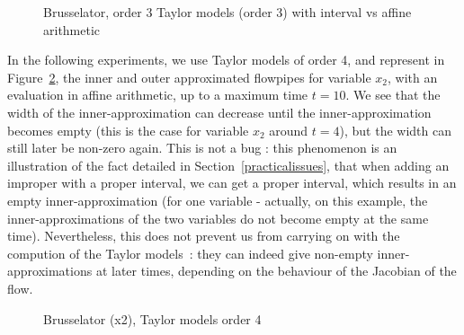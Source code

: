 \begin{figure}[htbp]
\begin{center}
\end{center}
\caption{Brusselator, order 3 Taylor models (order 3) with interval vs affine arithmetic \label{fig:brusselator_order3_t1}}
\end{figure}

In the following experiments, we use Taylor models of order 4, and represent  in Figure~\ref{fig:brusselator_order4_x2_t10}, the inner and outer approximated flowpipes for variable $x_2$, with an evaluation in affine arithmetic, up to a maximum time $t=10$. We see that the width of the inner-approximation can decrease until the inner-approximation becomes empty (this is the case for variable $x_2$ around $t=4$), but the width can still later be non-zero again. 
This is not a bug : this phenomenon is an illustration of the fact detailed in Section~\ref{practicalissues}, that when adding an improper with a proper interval, we can get a proper interval, which results in an empty inner-approximation (for one variable - actually, on this example, the inner-approximations of the two variables do not become empty at the same time). 
Nevertheless, this does not prevent us from carrying
on with the compution of the Taylor models~:  they can indeed give non-empty inner-approximations at later times, 
depending on the behaviour of the Jacobian of the flow.    


\begin{figure}[htbp]
\begin{center}
\end{center}
\caption{Brusselator (x2), Taylor models order 4 \label{fig:brusselator_order4_x2_t10}}
\end{figure}



